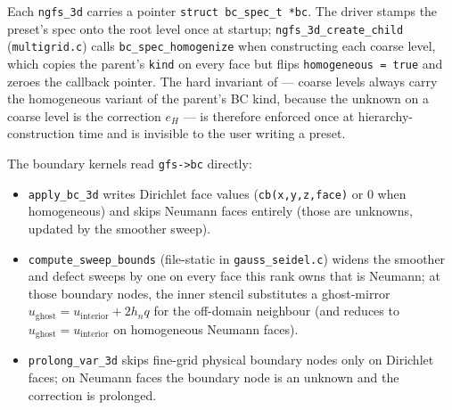 \documentclass[11pt]{article}
\theoremstyle{definition}
\begin{document}
Each \texttt{ngfs\_3d} carries a pointer \verb|struct bc_spec_t *bc|.
The driver stamps the preset's spec onto the root level once at
startup; \texttt{ngfs\_3d\_create\_child} (\texttt{multigrid.c}) calls
\texttt{bc\_spec\_homogenize} when constructing each coarse level,
which copies the parent's \texttt{kind} on every face but flips
\verb|homogeneous = true| and zeroes the callback pointer.  The
hard invariant of  --- coarse levels always carry
the homogeneous variant of the parent's BC kind, because the unknown
on a coarse level is the correction $e_{H}$ --- is therefore enforced
once at hierarchy-construction time and is invisible to the user
writing a preset.

The boundary kernels read \verb|gfs->bc| directly:
\begin{itemize}[leftmargin=*,nosep]
\item \texttt{apply\_bc\_3d} writes Dirichlet face values
  (\verb|cb(x,y,z,face)| or $0$ when homogeneous) and skips Neumann
  faces entirely (those are unknowns, updated by the smoother sweep).
\item \texttt{compute\_sweep\_bounds} (file-static in
  \texttt{gauss\_seidel.c}) widens the smoother and defect sweeps by
  one on every face this rank owns that is Neumann; at those
  boundary nodes, the inner stencil substitutes a ghost-mirror
  $u_{\text{ghost}} = u_{\text{interior}} + 2 h_n q$ for the
  off-domain neighbour (and reduces to $u_{\text{ghost}} =
  u_{\text{interior}}$ on homogeneous Neumann faces).
\item \texttt{prolong\_var\_3d} skips fine-grid physical boundary
  nodes only on Dirichlet faces; on Neumann faces the boundary node
  is an unknown and the correction is prolonged.
\end{itemize}
\end{document}

